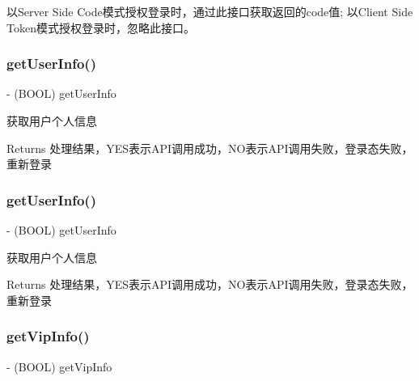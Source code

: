 以\+Server Side Code模式授权登录时，通过此接口获取返回的code值; 以\+Client Side Token模式授权登录时，忽略此接口。 \mbox{\label{interface_tencent_o_auth_a442df11581fef0f224ad8c1abfb52c0a}} 
\subsubsection{\texorpdfstring{get\+User\+Info()}{getUserInfo()}\hspace{0.1cm}{\footnotesize\ttfamily [1/2]}}
{\footnotesize\ttfamily -\/ (B\+O\+OL) get\+User\+Info \begin{DoxyParamCaption}{ }\end{DoxyParamCaption}}

获取用户个人信息 \begin{DoxyReturn}{Returns}
处理结果，\+Y\+E\+S表示\+A\+P\+I调用成功，\+N\+O表示\+A\+P\+I调用失败，登录态失败，重新登录 
\end{DoxyReturn}
\mbox{\label{interface_tencent_o_auth_a442df11581fef0f224ad8c1abfb52c0a}} 
\subsubsection{\texorpdfstring{get\+User\+Info()}{getUserInfo()}\hspace{0.1cm}{\footnotesize\ttfamily [2/2]}}
{\footnotesize\ttfamily -\/ (B\+O\+OL) get\+User\+Info \begin{DoxyParamCaption}{ }\end{DoxyParamCaption}}

获取用户个人信息 \begin{DoxyReturn}{Returns}
处理结果，\+Y\+E\+S表示\+A\+P\+I调用成功，\+N\+O表示\+A\+P\+I调用失败，登录态失败，重新登录 
\end{DoxyReturn}
\mbox{\label{interface_tencent_o_auth_a0dca2b46ec141f5718f2fc8cecab251a}} 
\subsubsection{\texorpdfstring{get\+Vip\+Info()}{getVipInfo()}\hspace{0.1cm}{\footnotesize\ttfamily [1/2]}}
{\footnotesize\ttfamily -\/ (B\+O\+OL) get\+Vip\+Info \begin{DoxyParamCaption}{ }\end{DoxyParamCaption}}

